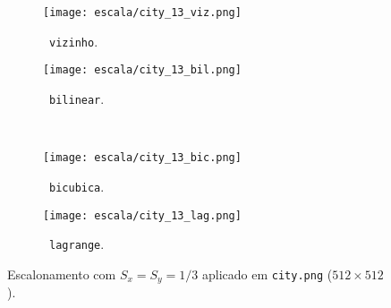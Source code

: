 \begin{figure}[H]
    \centering
    \begin{subfigure}{0.3\textwidth}
        \centering
        \texttt{[image: escala/city\_13\_viz.png]}
        \caption{~\texttt{vizinho}.}
    \end{subfigure}%
    \hspace{8pt}
    \begin{subfigure}{0.3\textwidth}
        \centering
        \texttt{[image: escala/city\_13\_bil.png]}
        \caption{~\texttt{bilinear}.}
    \end{subfigure}
    \\[8pt]
    \begin{subfigure}{0.3\textwidth}
        \centering
        \texttt{[image: escala/city\_13\_bic.png]}
        \caption{~\texttt{bicubica}.}
    \end{subfigure}%
    \hspace{8pt}%
    \begin{subfigure}{0.3\textwidth}
        \centering
        \texttt{[image: escala/city\_13\_lag.png]}
        \caption{~\texttt{lagrange}.}
    \end{subfigure}

    \caption{Escalonamento com $S_x = S_y = 1/3$ aplicado em \texttt{city.png} ($512 \times 512$).}
    \label{fig:esc:13}
\end{figure}